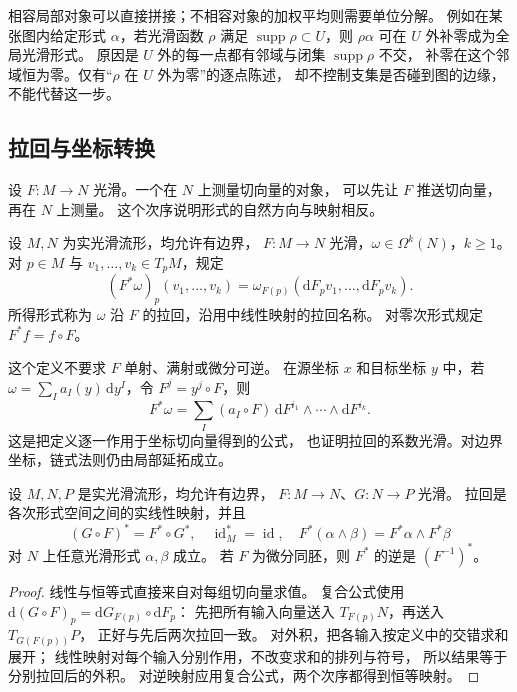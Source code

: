 相容局部对象可以直接拼接；不相容对象的加权平均则需要单位分解。
例如在某张图内给定形式 \(\alpha\)，若光滑函数 \(\rho\)
满足 \(\operatorname{supp}\rho\subset U\)，则 \(\rho\alpha\)
可在 \(U\) 外补零成为全局光滑形式。
原因是 \(U\) 外的每一点都有邻域与闭集 \(\operatorname{supp}\rho\) 不交，
补零在这个邻域恒为零。仅有“\(\rho\) 在 \(U\) 外为零”的逐点陈述，
却不控制支集是否碰到图的边缘，不能代替这一步。

\subsection{拉回与坐标转换}
\label{b1:subsec:E10302}

设 \(F:M\to N\) 光滑。一个在 \(N\) 上测量切向量的对象，
可以先让 \(F\) 推送切向量，再在 \(N\) 上测量。
这个次序说明形式的自然方向与映射相反。

\begin{definition}\label{b1:def:E-pullback}
设 \(M,N\) 为实光滑流形，均允许有边界，
\(F:M\to N\) 光滑，\(\omega\in\Omega^k(N)\)，\(k\geq1\)。
对 \(p\in M\) 与 \(v_1,\ldots,v_k\in T_pM\)，规定
\[
 (F^*\omega)_p(v_1,\ldots,v_k)
 =\omega_{F(p)}(\mathrm dF_pv_1,\ldots,\mathrm dF_pv_k).
\]
所得形式称为 \(\omega\) 沿 \(F\) 的拉回，沿用中线性映射的拉回名称。
对零次形式规定 \(F^*f=f\circ F\)。
\end{definition}

这个定义不要求 \(F\) 单射、满射或微分可逆。
在源坐标 \(x\) 和目标坐标 \(y\) 中，若
\(\omega=\sum_I a_I(y)\,\mathrm dy^I\)，令 \(F^j=y^j\circ F\)，则
\begin{equation}
 F^*\omega=\sum_I(a_I\circ F)\,
       \mathrm dF^{i_1}\wedge\cdots\wedge\mathrm dF^{i_k}.
 \label{b1:eq:E-pullback-coordinates}
\end{equation}
这是把定义逐一作用于坐标切向量得到的公式，
也证明拉回的系数光滑。对边界坐标，链式法则仍由局部延拓成立。

\begin{proposition}[拉回的运算]\label{b1:prop:E-pullback-algebra}
设 \(M,N,P\) 是实光滑流形，均允许有边界，
\(F:M\to N\)、\(G:N\to P\) 光滑。
拉回是各次形式空间之间的实线性映射，并且
\[
 (G\circ F)^*=F^*\circ G^*,\quad
 \operatorname{id}_M^*=\operatorname{id},\quad
 F^*(\alpha\wedge\beta)=F^*\alpha\wedge F^*\beta
\]
对 \(N\) 上任意光滑形式 \(\alpha,\beta\) 成立。
若 \(F\) 为微分同胚，则 \(F^*\) 的逆是 \((F^{-1})^*\)。
\end{proposition}
\begin{proof}
线性与恒等式直接来自对每组切向量求值。
复合公式使用
\(\mathrm d(G\circ F)_p=\mathrm dG_{F(p)}\circ\mathrm dF_p\)：
先把所有输入向量送入 \(T_{F(p)}N\)，再送入 \(T_{G(F(p))}P\)，
正好与先后两次拉回一致。
对外积，把各输入按定义中的交错求和展开；
线性映射对每个输入分别作用，不改变求和的排列与符号，
所以结果等于分别拉回后的外积。
对逆映射应用复合公式，两个次序都得到恒等映射。
\end{proof}

